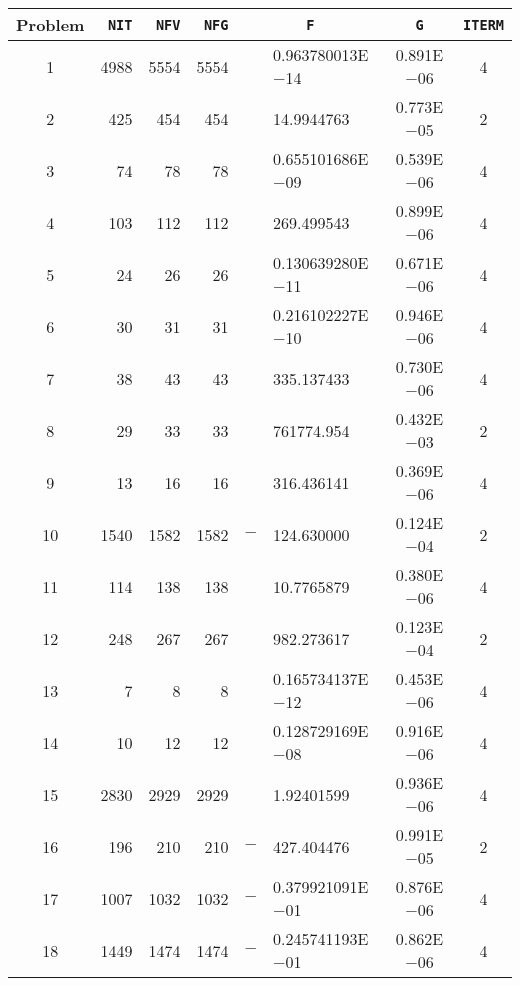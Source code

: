 \documentclass{esub2acm}
\begin{document}
\begin{table}
\footnotesize
\centering
\begin{tabular}{c|rrrr@{}lcc} \hline
Problem\rule[-2pt]{0pt}{12pt}  & {\tt NIT} & {\tt NFV} & {\tt NFG} & \multicolumn{2}{c}{\tt F} & {\tt G} & {\tt ITERM} \\ \hline
1\rule[-2pt]{0pt}{12pt} &   4988    &   5554    &   5554    &       &   0.963780013E$-$14   &   0.891E$-$06 &   4   \\
2   &   425 &   454 &   454 &       &   14.9944763  &   0.773E$-$05 &   2   \\
3   &   74  &   78  &   78  &       &   0.655101686E$-$09   &   0.539E$-$06 &   4   \\
4   &   103 &   112 &   112 &       &   269.499543  &   0.899E$-$06 &   4   \\
5   &   24  &   26  &   26  &       &   0.130639280E$-$11   &   0.671E$-$06 &   4   \\
6   &   30  &   31  &   31  &       &   0.216102227E$-$10   &   0.946E$-$06 &   4   \\
7   &   38  &   43  &   43  &       &   335.137433  &   0.730E$-$06 &   4   \\
8   &   29  &   33  &   33  &       &   761774.954  &   0.432E$-$03 &   2   \\
9   &   13  &   16  &   16  &       &   316.436141  &   0.369E$-$06 &   4   \\
10  &   1540    &   1582    &   1582    &   $-$ &   124.630000  &   0.124E$-$04 &   2   \\
11  &   114 &   138 &   138 &       &   10.7765879  &   0.380E$-$06 &   4   \\
12  &   248 &   267 &   267 &       &   982.273617  &   0.123E$-$04 &   2   \\
13  &   7   &   8   &   8   &       &   0.165734137E$-$12   &   0.453E$-$06 &   4   \\
14  &   10  &   12  &   12  &       &   0.128729169E$-$08   &   0.916E$-$06 &   4   \\
15  &   2830    &   2929    &   2929    &       &   1.92401599  &   0.936E$-$06 &   4   \\
16  &   196 &   210 &   210 &   $-$ &   427.404476  &   0.991E$-$05 &   2   \\
17  &   1007    &   1032    &   1032    &   $-$ &   0.379921091E$-$01   &   0.876E$-$06 &   4   \\
18  &   1449    &   1474    &   1474    &   $-$ &   0.245741193E$-$01   &   0.862E$-$06 &   4   \\

\end{tabular}
\end{table}
\end{document}
